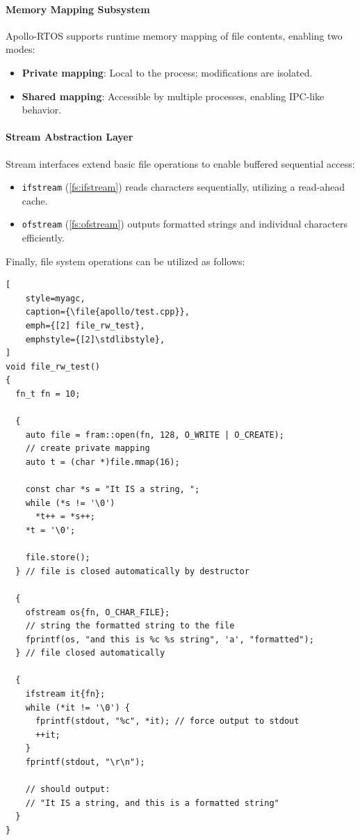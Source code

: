 \paragraph*{Memory Mapping Subsystem} Apollo-RTOS supports runtime memory mapping of
file contents, enabling two modes:
\begin{itemize}
    \item \textbf{Private mapping}: Local to the process; modifications are isolated.
    \item \textbf{Shared mapping}: Accessible by multiple processes, enabling IPC-like
        behavior.
\end{itemize}

\paragraph*{Stream Abstraction Layer} Stream interfaces extend basic file operations to
enable buffered sequential access:
\begin{itemize}
    \item \lstinline[style=myagc]|ifstream| (\autoref{fs:ifstream}) reads characters
        sequentially, utilizing a read-ahead cache.
    \item \lstinline[style=myagc]|ofstream| (\autoref{fs:ofstream}) outputs formatted
        strings and individual characters efficiently.
\end{itemize}


Finally, file system operations can be utilized as follows:

\begin{lstlisting}[
    style=myagc,
    caption={\file{apollo/test.cpp}},
    emph={[2] file_rw_test},
    emphstyle={[2]\stdlibstyle},
]
void file_rw_test()
{
  fn_t fn = 10;

  {
    auto file = fram::open(fn, 128, O_WRITE | O_CREATE);
    // create private mapping
    auto t = (char *)file.mmap(16); 

    const char *s = "It IS a string, ";
    while (*s != '\0')
      *t++ = *s++;
    *t = '\0';

    file.store(); 
  } // file is closed automatically by destructor

  {
    ofstream os{fn, O_CHAR_FILE};
    // string the formatted string to the file
    fprintf(os, "and this is %c %s string", 'a', "formatted");
  } // file closed automatically

  {
    ifstream it{fn};
    while (*it != '\0') {
      fprintf(stdout, "%c", *it); // force output to stdout
      ++it;
    }
    fprintf(stdout, "\r\n");

    // should output: 
    // "It IS a string, and this is a formatted string"
  }
}
\end{lstlisting}
